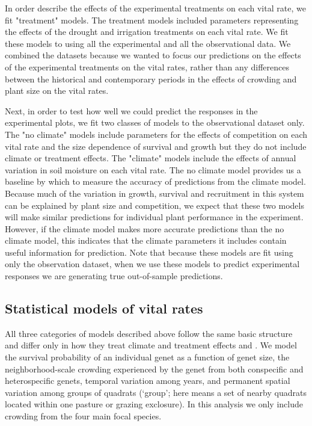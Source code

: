 \documentclass[11pt]{article}
\begin{document}
\begin{doublespacing}
In order describe the effects of the experimental treatments on each vital rate, we fit "treatment" models. The treatment models included parameters representing the effects of the drought and irrigation treatments on each vital rate. We fit these models to using all the experimental and all the observational data. We combined the datasets because we wanted to focus our predictions on the effects of the experimental treatments on the vital rates, rather than any differences between the historical and contemporary periods in the effects of crowding and plant size on the vital rates. 

Next, in order to test how well we could predict the responses in the experimental plots, we fit two classes of models to the observational dataset only.  The "no climate" models include parameters for the effects of competition on each vital rate and the size dependence of survival and growth but they do not include climate or treatment effects. The "climate" models include the effects of annual variation in soil moisture on each vital rate. The no climate model provides us a baseline by which to measure the accuracy of predictions from the climate model. Because much of the variation in growth, survival and recruitment in this system can be explained by plant size and competition, we expect that these two models will make similar predictions for individual plant performance in the experiment.  However, if the climate model makes more accurate predictions than the no climate model, this indicates that the climate parameters it includes contain useful information for prediction. Note that because these models are fit using only the observation dataset, when we use  these models to predict experimental responses we are generating true out-of-sample predictions.
 
\subsection*{Statistical models of vital rates}

All three categories of models described above follow the same basic structure and differ only in how they treat climate and treatment effects and  \citep{adler_coexistence_2010,chu_large_2015}. We model the survival probability of an individual genet as a function of genet size, the neighborhood-scale crowding experienced by the genet from both conspecific and heterospecific genets, temporal variation among years, and permanent spatial variation among groups of quadrats (`group'; here means a set of nearby quadrats located within one pasture or grazing exclosure). In this analysis we only include crowding from the four main focal species. 


\end{doublespacing}
\end{document}
